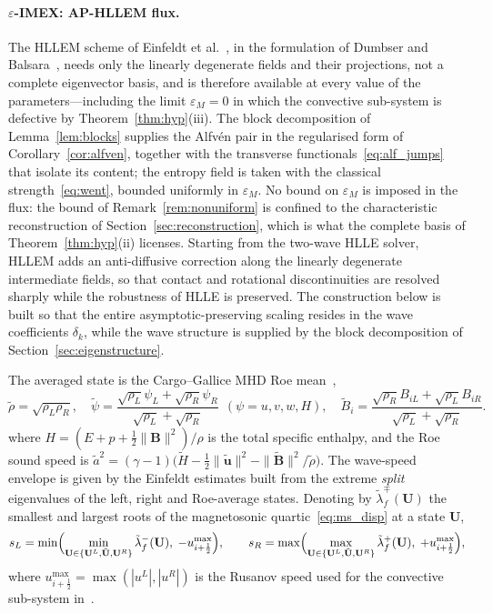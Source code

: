 \documentclass[a4paper,fleqn]{cas-sc}
\theoremstyle{remark}
\newcommand{\eps}{\varepsilon}
\newcommand{\epsM}{\eps_{M}}
\begin{document}
\paragraph{$\eps$-IMEX: AP-HLLEM flux.}
The HLLEM scheme of Einfeldt et al.~\cite{einfeldt1991godunov}, in the
formulation of Dumbser and Balsara~\cite{HLLEM}, needs only the linearly
degenerate fields and their projections, not a complete eigenvector basis, and
is therefore available at every value of the parameters---including the limit
$\epsM=0$ in which the convective sub-system is defective by
Theorem~\ref{thm:hyp}(iii). The block decomposition of
Lemma~\ref{lem:blocks} supplies the Alfv\'en pair in the regularised form of
Corollary~\ref{cor:alfven}, together with the transverse
functionals~\eqref{eq:alf_jumps} that isolate its content; the entropy field is
taken with the classical strength~\eqref{eq:went}, bounded uniformly in
$\epsM$. No bound on $\epsM$ is imposed in the flux: the bound of
Remark~\ref{rem:nonuniform} is confined to the characteristic reconstruction of
Section~\ref{sec:reconstruction}, which is what the complete basis of
Theorem~\ref{thm:hyp}(ii) licenses.
Starting from the two-wave HLLE solver, HLLEM adds an anti-diffusive correction
along the linearly degenerate intermediate fields, so that contact and rotational
discontinuities are resolved sharply while the robustness of HLLE is preserved.
The construction below is built so that the entire asymptotic-preserving scaling
resides in the wave coefficients $\delta_k$, while the wave structure is supplied
by the block decomposition of Section~\ref{sec:eigenstructure}.

The averaged state is the Cargo--Gallice MHD Roe mean~\cite{CargoGallice1997},
\begin{equation}
\label{eq:roe}
\tilde\rho=\sqrt{\rho_L\rho_R},\quad
\tilde\psi=\frac{\sqrt{\rho_L}\psi_L+\sqrt{\rho_R}\psi_R}{\sqrt{\rho_L}+\sqrt{\rho_R}}\ \ (\psi=u,v,w,H),\quad
\tilde B_i=\frac{\sqrt{\rho_R}B_{iL}+\sqrt{\rho_L}B_{iR}}{\sqrt{\rho_L}+\sqrt{\rho_R}}.
\end{equation}
where $H=(E+p+\tfrac12\|\mathbf B\|^2)/\rho$ is the total specific enthalpy, and the
Roe sound speed is
$\tilde a^2=(\gamma-1)\big(\tilde H-\tfrac12\|\tilde{\mathbf u}\|^2-\|\tilde{\mathbf B}\|^2/\tilde\rho\big)$. The wave-speed envelope is given by the Einfeldt estimates built from the extreme
\emph{split} eigenvalues of the left, right and Roe-average states. Denoting by
$\tilde\lambda^{\mp}_{f}(\mathbf{U})$ the smallest and largest roots of the magnetosonic
quartic~\eqref{eq:ms_disp} at a state $\mathbf{U}$,
\begin{equation}
\label{eq:einfeldt}
s_{L}=\min\Bigl(\min_{\mathbf{U}\in\{\mathbf{U}^{L},\tilde{\mathbf{U}},\mathbf{U}^{R}\}}\tilde\lambda^{-}_{f}(\mathbf{U}),\;-u^{\max}_{i+\frac12}\Bigr),
\qquad
s_{R}=\max\Bigl(\max_{\mathbf{U}\in\{\mathbf{U}^{L},\tilde{\mathbf{U}},\mathbf{U}^{R}\}}\tilde\lambda^{+}_{f}(\mathbf{U}),\;+u^{\max}_{i+\frac12}\Bigr),
\end{equation}
where $u^{\max}_{i+\frac12}=\max(|u^{L}|,|u^{R}|)$ is the Rusanov speed used for
the convective sub-system in~\cite{MHDIMEX}.
\end{document}
